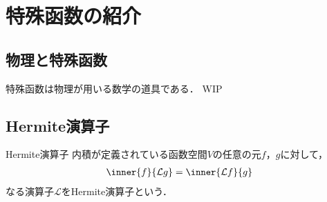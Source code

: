 \documentclass{report}
\begin{document}
  \chapter{特殊函数の紹介}
    \section{物理と特殊函数}
      特殊函数は物理が用いる数学の道具である．
      WIP
    \section{Hermite演算子}
      \begin{mydef}{Hermite演算子}{}
        内積が定義されている函数空間$V$の任意の元$f$，$g$に対して，
        \begin{align}
          \inner{f}{\mathcal{L}g} = \inner{\mathcal{L}f}{g}
        \end{align}
        なる演算子$\mathcal{L}$をHermite演算子という．
      \end{mydef}
\end{document}
